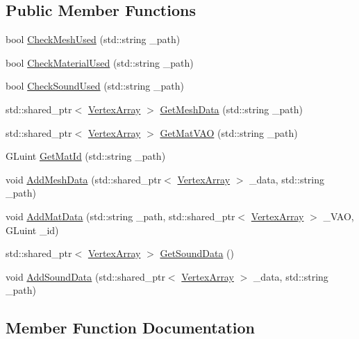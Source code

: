 \subsection*{Public Member Functions}
\begin{DoxyCompactItemize}
\item 
bool \mbox{\hyperlink{class_resources_a95b7267455d6a92af4b7525317e6fda2}{Check\+Mesh\+Used}} (std\+::string \+\_\+path)
\item 
bool \mbox{\hyperlink{class_resources_a7fa1d49c4fa656c355547235687f7cf2}{Check\+Material\+Used}} (std\+::string \+\_\+path)
\item 
bool \mbox{\hyperlink{class_resources_a7c9a86ab08c2e391771efec6570a55e3}{Check\+Sound\+Used}} (std\+::string \+\_\+path)
\item 
std\+::shared\+\_\+ptr$<$ \mbox{\hyperlink{class_vertex_array}{Vertex\+Array}} $>$ \mbox{\hyperlink{class_resources_adf647cccbff04491447ef4ccb262e2de}{Get\+Mesh\+Data}} (std\+::string \+\_\+path)
\item 
std\+::shared\+\_\+ptr$<$ \mbox{\hyperlink{class_vertex_array}{Vertex\+Array}} $>$ \mbox{\hyperlink{class_resources_a8225551fdeddbf2b6f34d44323f7333e}{Get\+Mat\+V\+AO}} (std\+::string \+\_\+path)
\item 
G\+Luint \mbox{\hyperlink{class_resources_a337663d0deaccb636135494a42400b52}{Get\+Mat\+Id}} (std\+::string \+\_\+path)
\item 
void \mbox{\hyperlink{class_resources_a44d04fc717db8de2e1e402e2927f99ff}{Add\+Mesh\+Data}} (std\+::shared\+\_\+ptr$<$ \mbox{\hyperlink{class_vertex_array}{Vertex\+Array}} $>$ \+\_\+data, std\+::string \+\_\+path)
\item 
void \mbox{\hyperlink{class_resources_a960db51890620adeb83f2a2c30b40af9}{Add\+Mat\+Data}} (std\+::string \+\_\+path, std\+::shared\+\_\+ptr$<$ \mbox{\hyperlink{class_vertex_array}{Vertex\+Array}} $>$ \+\_\+\+V\+AO, G\+Luint \+\_\+id)
\item 
std\+::shared\+\_\+ptr$<$ \mbox{\hyperlink{class_vertex_array}{Vertex\+Array}} $>$ \mbox{\hyperlink{class_resources_a163cbc0337f5262b19098766d85196a1}{Get\+Sound\+Data}} ()
\item 
void \mbox{\hyperlink{class_resources_a178691b808af645c7642b4bf4915ceba}{Add\+Sound\+Data}} (std\+::shared\+\_\+ptr$<$ \mbox{\hyperlink{class_vertex_array}{Vertex\+Array}} $>$ \+\_\+data, std\+::string \+\_\+path)
\end{DoxyCompactItemize}


\subsection{Member Function Documentation}
\mbox{\label{class_resources_a960db51890620adeb83f2a2c30b40af9}} 
